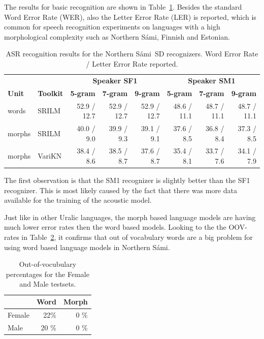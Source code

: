 \documentclass[b5paper]{article}
\newcommand{\ns}{Northern Sámi}
\begin{document}
The results for basic recognition are shown in Table~\ref{tbl:samibasic}. Besides the standard Word Error Rate (WER), also the Letter Error Rate (LER) is reported, which is common for speech recognition experiments on languages with a high morphological complexity such as \ns, Finnish and Estonian.

\begin{table}[!h]
\centering
\begin{tabular}{ll|rrr|rrr}
& & \multicolumn{3}{|c|}{\textbf{Speaker SF1}} & \multicolumn{3}{|c}{\textbf{Speaker SM1}} \\
 \textbf{Unit} & \textbf{Toolkit} & \textbf{5-gram} & \textbf{7-gram} & \textbf{9-gram} & \textbf{5-gram} & \textbf{7-gram} & \textbf{9-gram}\\\hline
 words & SRILM & 52.9 / 12.7 & 52.9 / 12.7& 52.9 / 12.7&48.6 / 11.1 & 48.7 / 11.1 & 48.7 / 11.1\\
morphs & SRILM & 40.0 /  9.0 & 39.9 / 9.3& 39.1 / 9.1 & 37.6 / 8.5 & 36.8 / 8.4 & 37.3 / 8.5 \\
 morphs & VariKN  & 38.4 / 8.6& 38.5 / 8.7  & 37.6 / 8.7 & 35.4 / 8.1 &  33.7 / 7.6 & 34.1 / 7.9 \\

\end{tabular}
\caption{ASR recognition results for the \ns\ SD recognizers. Word Error Rate / Letter Error Rate reported.\label{tbl:samibasic}}
\end{table}


The first observation is that the SM1 recognizer is slightly better than the SF1 recognizer. This is most likely caused by the fact that there was more data available for the training of the acoustic model.

Just like in other Uralic languages, the morph based language models are having much lower error rates then the word based models. Looking to the  the OOV-rates in Table~\ref{tbl:samioov}, it confirms that out of vocabulary words are a big problem for using word based language models in \ns.

\begin{table}[!h]
\centering
\begin{tabular}{lrr}
& Word & Morph\\\hline
Female &  22\% & 0 \% \\
Male & 20 \% & 0 \%\\
\end{tabular}
\caption{Out-of-vocubulary percentages for the Female and Male testsets. \label{tbl:samioov}}
\end{table}
\end{document}
